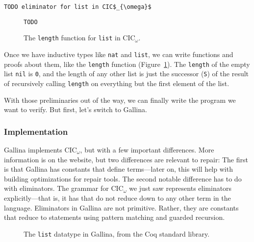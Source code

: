 \begin{lstlisting}
TODO eliminator for list in CIC$_{\omega}$
\end{lstlisting}

\begin{figure}
\begin{lstlisting}
TODO
\end{lstlisting}
\caption{The \lstinline{length} function for \lstinline{list} in CIC$_{\omega}$.}
\label{fig:length-theory}
\end{figure}

Once we have inductive types like \lstinline{nat} and \lstinline{list}, we can write functions and proofs about them, like the \lstinline{length} function (Figure~\ref{fig:length-theory}).
The \lstinline{length} of the empty list \lstinline{nil} is \lstinline{0}, and the length of any other list
is just the successor (\lstinline{S}) of the result of recursively calling \lstinline{length} on everything but the first element of the list.

With those preliminaries out of the way, we can finally write the program we want to verify.
But first, let's switch to Gallina.

\subsubsection{Implementation}
\label{sec:gallina}

Gallina implements CIC$_{\omega}$, but with a few important differences.
More information is on the website, %
but two differences are relevant to repair:
The first is that Gallina has constants that define terms---later on, this will help with building optimizations for repair tools.
The second notable difference has to do with eliminators.
The grammar for CIC$_{\omega}$ we just saw represents eliminators explicitly---that is, it has  that do
not reduce down to any other term in the language.
Eliminators in Gallina are not primitive.
Rather, they are constants that reduce to statements using pattern matching and guarded recursion.

\begin{figure}
   
\caption{The \lstinline{list} datatype in Gallina, from the Coq standard library.}
\label{fig:list}
\end{figure}

